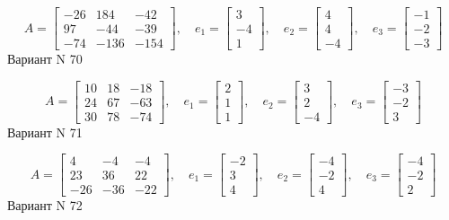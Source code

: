 \documentclass[11pt]{report}
\begin{document}
$$A = \left[\begin{matrix}-26 & 184 & -42\\97 & -44 & -39\\-74 & -136 & -154\end{matrix}\right],\quad e_1 = \left[\begin{matrix}3\\-4\\1\end{matrix}\right],\quad e_2 = \left[\begin{matrix}4\\4\\-4\end{matrix}\right],\quad e_3 = \left[\begin{matrix}-1\\-2\\-3\end{matrix}\right]$$Вариант N 70

$$A = \left[\begin{matrix}10 & 18 & -18\\24 & 67 & -63\\30 & 78 & -74\end{matrix}\right],\quad e_1 = \left[\begin{matrix}2\\1\\1\end{matrix}\right],\quad e_2 = \left[\begin{matrix}3\\2\\-4\end{matrix}\right],\quad e_3 = \left[\begin{matrix}-3\\-2\\3\end{matrix}\right]$$Вариант N 71

$$A = \left[\begin{matrix}4 & -4 & -4\\23 & 36 & 22\\-26 & -36 & -22\end{matrix}\right],\quad e_1 = \left[\begin{matrix}-2\\3\\4\end{matrix}\right],\quad e_2 = \left[\begin{matrix}-4\\-2\\4\end{matrix}\right],\quad e_3 = \left[\begin{matrix}-4\\-2\\2\end{matrix}\right]$$Вариант N 72
\end{document}
